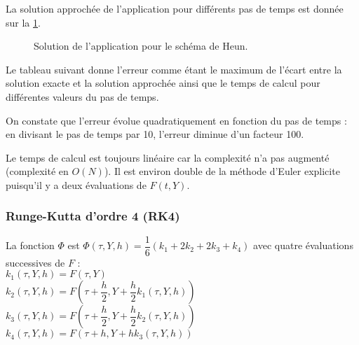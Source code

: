 \documentclass[10pt]{article}
\begin{document}
La solution approchée de l'application pour différents pas de temps est donnée sur la \ref{heun}.

\begin{figure}[!ht]
\centering

\caption{Solution de l'application pour le schéma de Heun.}
\label{heun}
\end{figure}

Le tableau suivant donne l'erreur comme étant le maximum de l'écart entre la solution exacte et la solution approchée ainsi que le temps de calcul pour différentes valeurs du pas de temps.

\begin{center}
\end{center}

On constate que l'erreur évolue quadratiquement en fonction du pas de temps : en divisant le pas de temps par 10, l'erreur diminue d'un facteur 100.

Le temps de calcul est toujours linéaire car la complexité n'a pas augmenté  (complexité en $O(N)$). Il est environ double de la méthode d'Euler explicite puisqu'il y a deux évaluations de $  {F}(t,  {Y})$.


\subsubsection{Runge-Kutta d'ordre 4 (RK4)}

La fonction $  {\Phi}$ est $  {\Phi}(\tau,  {Y},h) = \dfrac{1}{6}(k_1+2k_2+2k_3+k_4)$ avec quatre évaluations successives de $  {F}$ :\\
$k_1(\tau,  {Y},h) =   {F}(\tau,  {Y})$\\
$k_2(\tau,  {Y},h) =   {F}(\tau+\dfrac{h}{2},  {Y}+\dfrac{h}{2}k_1(\tau,  {Y},h))$\\
$k_3(\tau,  {Y},h) =   {F}(\tau+\dfrac{h}{2},  {Y}+\dfrac{h}{2}k_2(\tau,  {Y},h))$\\
$k_4(\tau,  {Y},h) =   {F}(\tau+h,  {Y}+hk_3(\tau,  {Y},h))$\\
\end{document}
